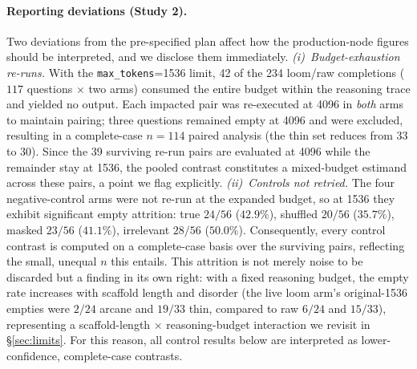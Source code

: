\documentclass[10pt,twocolumn]{article}
\begin{document}
\paragraph{Reporting deviations (Study 2).} Two deviations from the pre-specified plan affect how the production-node figures should be interpreted, and we disclose them immediately. \emph{(i)~Budget-exhaustion re-runs.} With the \texttt{max\_tokens}=1536 limit, 42 of the 234 loom/raw completions ($117$ questions $\times$ two arms) consumed the entire budget within the reasoning trace and yielded no output. Each impacted pair was re-executed at 4096 in \emph{both} arms to maintain pairing; three questions remained empty at 4096 and were excluded, resulting in a complete-case $n=114$ paired analysis (the thin set reduces from 33 to 30). Since the 39 surviving re-run pairs are evaluated at 4096 while the remainder stay at 1536, the pooled contrast constitutes a mixed-budget estimand across these pairs, a point we flag explicitly. \emph{(ii)~Controls not retried.} The four negative-control arms were not re-run at the expanded budget, so at 1536 they exhibit significant empty attrition: true $24/56$ ($42.9\%$), shuffled $20/56$ ($35.7\%$), masked $23/56$ ($41.1\%$), irrelevant $28/56$ ($50.0\%$). Consequently, every control contrast is computed on a complete-case basis over the surviving pairs, reflecting the small, unequal $n$ this entails. This attrition is not merely noise to be discarded but a finding in its own right: with a fixed reasoning budget, the empty rate increases with scaffold length and disorder (the live loom arm's original-1536 empties were $2/24$ arcane and $19/33$ thin, compared to raw $6/24$ and $15/33$), representing a scaffold-length $\times$ reasoning-budget interaction we revisit in \S\ref{sec:limits}. For this reason, all control results below are interpreted as lower-confidence, complete-case contrasts.
\end{document}
